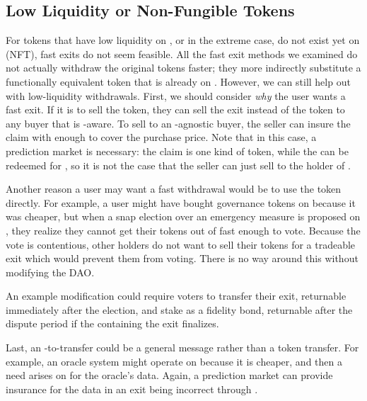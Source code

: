 \subsection{Low Liquidity or Non-Fungible Tokens}
\label{sec:nfts}

For tokens that have low liquidity on \layerone, or in the extreme case, do not exist yet on \layerone (\eg NFT), fast exits do not seem feasible. All the fast exit methods we examined do not actually withdraw the original tokens faster; they more indirectly substitute a functionally equivalent token that is already on \layerone. However, we can still help out with low-liquidity withdrawals. First, we should consider \textit{why} the user wants a fast exit. If it is to sell the token, they can sell the exit instead of the token to any buyer that is \layertwo-aware. To sell to an \layertwo-agnostic buyer, the seller can insure the claim with enough \fail to cover the purchase price. Note that in this case, a prediction market is necessary: the claim is one kind of token, while the \fail can be redeemed for \ethone, so it is not the case that the seller can just sell to the holder of \final.

Another reason a user may want a fast withdrawal would be to use the token directly. For example, a user might have bought governance tokens on \layertwo because it was cheaper, but when a snap election over an emergency measure is proposed on \layerone, they realize they cannot get their tokens out of \layertwo fast enough to vote. Because the vote is contentious, other holders do not want to sell their tokens for a tradeable exit which would prevent them from voting. There is no way around this without modifying the DAO.

An example modification could require voters to transfer their exit, returnable immediately after the election, and stake \ethone as a fidelity bond, returnable after the dispute period if the \rblock containing the exit finalizes.


Last, an \layertwo-to-\layerone transfer could be a general message rather than a token transfer. For example, an oracle system might operate on \layertwo because it is cheaper, and then a need arises on \layerone for the oracle's data. Again, a prediction market can provide insurance for the data in an exit being incorrect through \fail.


